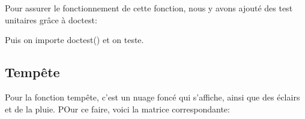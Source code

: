 \documentclass[letterpaper,10pt,english]{sphinxmanual}
\begin{document}
\sphinxAtStartPar
Pour assurer le fonctionnement de cette fonction, nous y avons ajouté des test unitaires grâce à doctest:

\begin{sphinxVerbatim}[commandchars=\\\{\}]
\end{sphinxVerbatim}

\sphinxAtStartPar
Puis on importe doctest() et on teste.

\begin{sphinxVerbatim}[commandchars=\\\{\}]
\end{sphinxVerbatim}


\subsection{Tempête}
\label{\detokenize{phenomene:tempete}}
\sphinxAtStartPar
Pour la fonction tempête, c’est un nuage foncé qui s’affiche, ainsi que des éclairs et de la pluie. POur ce faire, voici la matrice correspondante:
\end{document}
